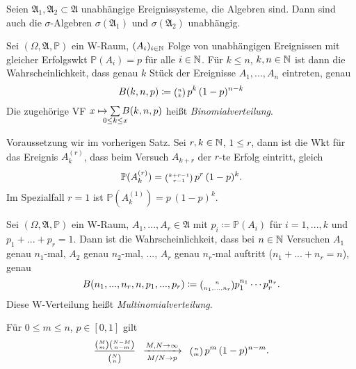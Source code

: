\documentclass{cheat-sheet}
\newcommand{\Alg}{\mathfrak{A}} %
\renewcommand{\P}{\mathbb{P}} %
\let\myBinom\binom
\renewcommand{\binom}[2]{\mathsmaller{\myBinom{#1}{#2}}}
\begin{document}
\begin{satz}
  Seien $\Alg_1, \Alg_2 \subset \Alg$ unabhängige Ereignissysteme, die Algebren sind. Dann sind auch die $\sigma$-Algebren $\sigma(\Alg_1)$ und $\sigma(\Alg_2)$ unabhängig.
\end{satz}





\begin{satz}
  Sei $(\Omega, \Alg, \P)$ ein W-Raum, $(A_i)_{i \in \mathbb{N}}$ Folge von unabhängigen Ereignissen mit gleicher Erfolgswkt $\P(A_i) = p$ für alle $i \in \mathbb{N}$. Für $k \leq n$, $k, n \in \mathbb{N}$ ist dann die Wahrscheinlichkeit, dass genau $k$ Stück der Ereignisse $A_1, ..., A_n$ eintreten, genau
  \[ B(k, n, p) \coloneqq \binom{n}{k} \, p^k \, (1-p)^{n-k} \]
  Die zugehörige VF $x \mapsto \sum_{\mathclap{0 \leq k \leq x}} B(k,n,p)$ heißt \emph{Binomialverteilung}.
\end{satz}


\begin{lem}
  Voraussetzung wir im vorherigen Satz. Sei $r, k \in \mathbb{N}$, $1 \leq r$, dann ist die Wkt für das Ereignis $A_k^{(r)}$, dass beim Versuch $A_{k+r}$ der $r$-te Erfolg eintritt, gleich
  \[ \P(A_k^{(r)}) = \binom{k+r-1}{r-1} \, p^r \, (1-p)^k. \]
  Im Spezialfall $r = 1$ ist $\P(A_k^{(1)}) = p \, (1-p)^k$.
\end{lem}

\begin{satz}
  Sei $(\Omega, \Alg, \P)$ ein W-Raum, $A_1, ..., A_r \in \Alg$ mit $p_i \coloneqq \P(A_i)$ für $i = 1, ..., k$ und $p_1 + ... + p_r = 1$. Dann ist die Wahrscheinlichkeit, dass bei $n \in \mathbb{N}$ Versuchen $A_1$ genau $n_1$-mal, $A_2$ genau $n_2$-mal, ..., $A_r$ genau $n_r$-mal auftritt ($n_1 + ... + n_r = n$), genau
  \[ B(n_1, ..., n_r, n, p_1, ..., p_r) \coloneqq \binom{n}{n_1, ..., n_r} p_1^{n_1} \cdots p_r^{n_r}. \]
  Diese W-Verteilung heißt \emph{Multinomialverteilung}.
\end{satz}


\begin{satz}
  Für $0 \leq m \leq n$, $p \in [0, 1]$ gilt
  \[ \frac{\binom{M}{m} \binom{N-M}{n-m}}{\binom{N}{n}} \enspace \xrightarrow[M/N \to p]{M, N \to \infty} \enspace \binom{n}{m} \, p^m \, (1-p)^{n-m}. \]
\end{satz}
\end{document}
